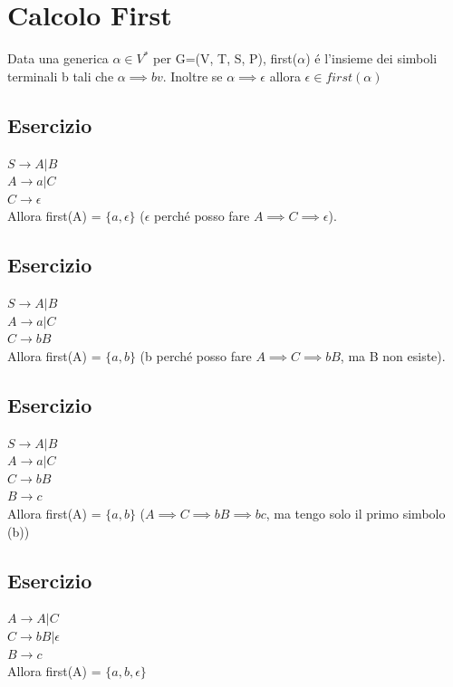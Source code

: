 \section{Calcolo First}
Data una generica $\alpha \in V^*$ per G=(V, T, S, P), first($\alpha$) \'e l'insieme dei simboli terminali b tali che $\alpha \implies bv$.
Inoltre se $\alpha \implies \epsilon $ allora $\epsilon \in first(\alpha )$

\subsection{Esercizio}
$S \rightarrow A|B$\\
$A \rightarrow a|C$\\
$C \rightarrow \epsilon$\\
Allora first(A) = $\{ a, \epsilon \}$ ($\epsilon$ perch\'e posso fare $A \implies C \implies \epsilon $). 

\subsection{Esercizio}
$S \rightarrow A|B$\\
$A \rightarrow a|C$\\
$C \rightarrow bB$\\
Allora first(A) = $\{ a, b \}$ (b perch\'e posso fare $A \implies C \implies bB$, ma B non esiste). 

\subsection{Esercizio}
$S \rightarrow A|B$\\
$A \rightarrow a|C$\\
$C \rightarrow bB$\\
$B \rightarrow c$\\
Allora first(A) = $\{ a, b \}$ ($A \implies C \implies bB \implies bc$, ma tengo solo il primo simbolo (b)) 

\subsection{Esercizio}
$A \rightarrow A|C$\\
$C \rightarrow bB|\epsilon$\\
$B \rightarrow c$\\
Allora first(A) = $\{ a, b, \epsilon\}$

